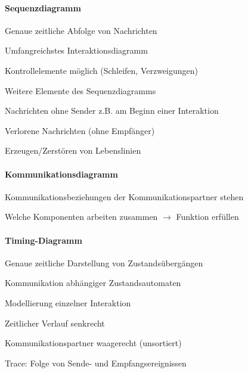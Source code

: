 \documentclass[a4paper]{article}
\begin{document}
\begin{multicols}{3}
  \paragraph{Sequenzdiagramm}
  \begin{itemize*}
    \item Genaue zeitliche Abfolge von Nachrichten
    \item Umfangreichstes Interaktionsdiagramm
    \item Kontrollelemente möglich (Schleifen, Verzweigungen)
    \item Weitere Elemente des Sequenzdiagramms
    \begin{itemize*}
      \item Nachrichten ohne Sender z.B. am Beginn einer Interaktion
      \item Verlorene Nachrichten (ohne Empfänger)
      \item Erzeugen/Zerstören von Lebenslinien
    \end{itemize*}
  \end{itemize*}

  \paragraph{Kommunikationsdiagramm}
  \begin{itemize*}
    \item Kommunikationsbeziehungen der Kommunikationspartner stehen
    \item Welche Komponenten arbeiten zusammen $\rightarrow$ Funktion erfüllen
  \end{itemize*}

  \paragraph{Timing-Diagramm}
  \begin{itemize*}
    \item Genaue zeitliche Darstellung von Zustandsübergängen
    \item Kommunikation abhängiger Zustandsautomaten
    \item Modellierung einzelner Interaktion
    \item Zeitlicher Verlauf senkrecht
    \item Kommunikationspartner waagerecht (unsortiert)
    \item Trace: Folge von Sende- und Empfangsereignissen
  \end{itemize*}


\end{multicols}
\end{document}
